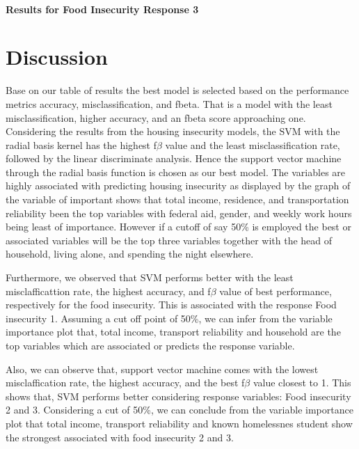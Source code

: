 \documentclass[
  10pt,
]{article}
\begin{document}
\hypertarget{results-for-food-insecurity-response-3}{%
\paragraph{Results for Food Insecurity Response 3}\label{results-for-food-insecurity-response-3}}

\hypertarget{discussion}{%
\section{Discussion}\label{discussion}}

Base on our table of results the best model is selected based on the performance metrics accuracy, misclassification, and fbeta. That is a model with the least misclassification, higher accuracy, and an fbeta score approaching one. Considering the results from the housing insecurity models, the SVM with the radial basis kernel has the highest f\(\beta\) value and the least misclassification rate, followed by the linear discriminate analysis. Hence the support vector machine through the radial basis function is chosen as our best model. The variables are highly associated with predicting housing insecurity as displayed by the graph of the variable of important shows that total income, residence, and transportation reliability been the top variables with federal aid, gender, and weekly work hours being least of importance. However if a cutoff of say 50\% is employed the best or associated variables will be the top three variables together with the head of household, living alone, and spending the night elsewhere.

Furthermore, we observed that SVM performs better with the least misclafficattion rate, the highest accuracy, and f\(\beta\) value of best performance, respectively for the food insecurity. This is associated with the response Food insecurity 1. Assuming a cut off point of 50\%, we can infer from the variable importance plot that, total income, transport reliability and household are the top variables which are associated or predicts the response variable.

Also, we can observe that, support vector machine comes with the lowest misclaffication rate, the highest accuracy, and the best f\(\beta\) value closest to 1. This shows that, SVM performs better considering response variables: Food insecurity 2 and 3. Considering a cut of 50\%, we can conclude from the variable importance plot that total income, transport reliability and known homelessnes student show the strongest associated with food insecurity 2 and 3.
\end{document}
